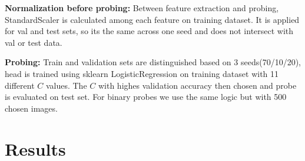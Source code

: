 \documentclass{article}
\begin{document}
\textbf{Normalization before probing: } Between feature extraction and probing, StandardScaler is calculated among each feature on training dataset. It is applied for val and test sets, so its the same across one seed and does not intersect with val or test data. 

\textbf{Probing: } Train and validation sets are distinguished based on 3 seeds(70/10/20), head is trained using sklearn LogisticRegression on training dataset with 11 different $C$ values. The $C$ with highes validation accuracy then chosen and probe is evaluated on test set. For binary probes we use the same logic but with 500 chosen images. 


\section{Results}
\end{document}
